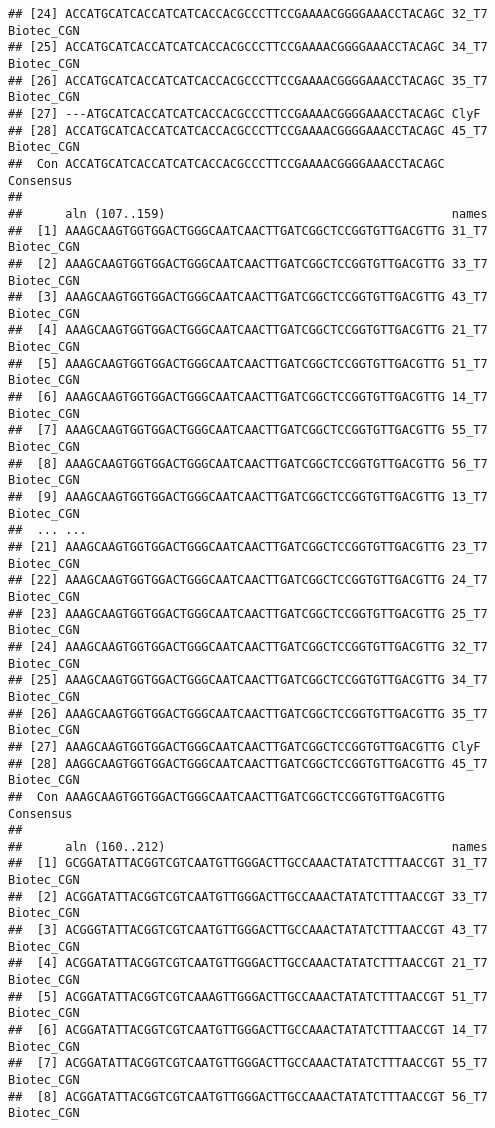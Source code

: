 \documentclass[
]{article}
\begin{document}
\begin{verbatim}
## [24] ACCATGCATCACCATCATCACCACGCCCTTCCGAAAACGGGGAAACCTACAGC 32_T7 Biotec_CGN
## [25] ACCATGCATCACCATCATCACCACGCCCTTCCGAAAACGGGGAAACCTACAGC 34_T7 Biotec_CGN
## [26] ACCATGCATCACCATCATCACCACGCCCTTCCGAAAACGGGGAAACCTACAGC 35_T7 Biotec_CGN
## [27] ---ATGCATCACCATCATCACCACGCCCTTCCGAAAACGGGGAAACCTACAGC ClyF
## [28] ACCATGCATCACCATCATCACCACGCCCTTCCGAAAACGGGGAAACCTACAGC 45_T7 Biotec_CGN
##  Con ACCATGCATCACCATCATCACCACGCCCTTCCGAAAACGGGGAAACCTACAGC Consensus 
## 
##      aln (107..159)                                        names
##  [1] AAAGCAAGTGGTGGACTGGGCAATCAACTTGATCGGCTCCGGTGTTGACGTTG 31_T7 Biotec_CGN
##  [2] AAAGCAAGTGGTGGACTGGGCAATCAACTTGATCGGCTCCGGTGTTGACGTTG 33_T7 Biotec_CGN
##  [3] AAAGCAAGTGGTGGACTGGGCAATCAACTTGATCGGCTCCGGTGTTGACGTTG 43_T7 Biotec_CGN
##  [4] AAAGCAAGTGGTGGACTGGGCAATCAACTTGATCGGCTCCGGTGTTGACGTTG 21_T7 Biotec_CGN
##  [5] AAAGCAAGTGGTGGACTGGGCAATCAACTTGATCGGCTCCGGTGTTGACGTTG 51_T7 Biotec_CGN
##  [6] AAAGCAAGTGGTGGACTGGGCAATCAACTTGATCGGCTCCGGTGTTGACGTTG 14_T7 Biotec_CGN
##  [7] AAAGCAAGTGGTGGACTGGGCAATCAACTTGATCGGCTCCGGTGTTGACGTTG 55_T7 Biotec_CGN
##  [8] AAAGCAAGTGGTGGACTGGGCAATCAACTTGATCGGCTCCGGTGTTGACGTTG 56_T7 Biotec_CGN
##  [9] AAAGCAAGTGGTGGACTGGGCAATCAACTTGATCGGCTCCGGTGTTGACGTTG 13_T7 Biotec_CGN 
##  ... ...
## [21] AAAGCAAGTGGTGGACTGGGCAATCAACTTGATCGGCTCCGGTGTTGACGTTG 23_T7 Biotec_CGN
## [22] AAAGCAAGTGGTGGACTGGGCAATCAACTTGATCGGCTCCGGTGTTGACGTTG 24_T7 Biotec_CGN
## [23] AAAGCAAGTGGTGGACTGGGCAATCAACTTGATCGGCTCCGGTGTTGACGTTG 25_T7 Biotec_CGN
## [24] AAAGCAAGTGGTGGACTGGGCAATCAACTTGATCGGCTCCGGTGTTGACGTTG 32_T7 Biotec_CGN
## [25] AAAGCAAGTGGTGGACTGGGCAATCAACTTGATCGGCTCCGGTGTTGACGTTG 34_T7 Biotec_CGN
## [26] AAAGCAAGTGGTGGACTGGGCAATCAACTTGATCGGCTCCGGTGTTGACGTTG 35_T7 Biotec_CGN
## [27] AAAGCAAGTGGTGGACTGGGCAATCAACTTGATCGGCTCCGGTGTTGACGTTG ClyF
## [28] AAGGCAAGTGGTGGACTGGGCAATCAACTTGATCGGCTCCGGTGTTGACGTTG 45_T7 Biotec_CGN
##  Con AAAGCAAGTGGTGGACTGGGCAATCAACTTGATCGGCTCCGGTGTTGACGTTG Consensus 
## 
##      aln (160..212)                                        names
##  [1] GCGGATATTACGGTCGTCAATGTTGGGACTTGCCAAACTATATCTTTAACCGT 31_T7 Biotec_CGN
##  [2] ACGGATATTACGGTCGTCAATGTTGGGACTTGCCAAACTATATCTTTAACCGT 33_T7 Biotec_CGN
##  [3] ACGGGTATTACGGTCGTCAATGTTGGGACTTGCCAAACTATATCTTTAACCGT 43_T7 Biotec_CGN
##  [4] ACGGATATTACGGTCGTCAATGTTGGGACTTGCCAAACTATATCTTTAACCGT 21_T7 Biotec_CGN
##  [5] ACGGATATTACGGTCGTCAAAGTTGGGACTTGCCAAACTATATCTTTAACCGT 51_T7 Biotec_CGN
##  [6] ACGGATATTACGGTCGTCAATGTTGGGACTTGCCAAACTATATCTTTAACCGT 14_T7 Biotec_CGN
##  [7] ACGGATATTACGGTCGTCAATGTTGGGACTTGCCAAACTATATCTTTAACCGT 55_T7 Biotec_CGN
##  [8] ACGGATATTACGGTCGTCAATGTTGGGACTTGCCAAACTATATCTTTAACCGT 56_T7 Biotec_CGN

\end{verbatim}
\end{document}
